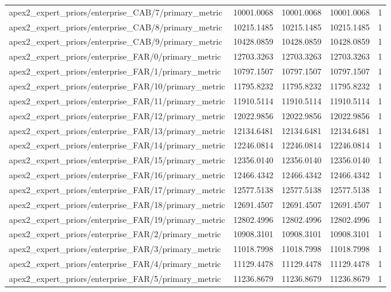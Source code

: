 \begin{table}[h]
\begin{tabular}{lrrrr}
apex2_expert_priors/enterprise_CAB/7/primary_metric & 10001.0068 & 10001.0068 & 10001.0068 & 1 \\
apex2_expert_priors/enterprise_CAB/8/primary_metric & 10215.1485 & 10215.1485 & 10215.1485 & 1 \\
apex2_expert_priors/enterprise_CAB/9/primary_metric & 10428.0859 & 10428.0859 & 10428.0859 & 1 \\
apex2_expert_priors/enterprise_FAR/0/primary_metric & 12703.3263 & 12703.3263 & 12703.3263 & 1 \\
apex2_expert_priors/enterprise_FAR/1/primary_metric & 10797.1507 & 10797.1507 & 10797.1507 & 1 \\
apex2_expert_priors/enterprise_FAR/10/primary_metric & 11795.8232 & 11795.8232 & 11795.8232 & 1 \\
apex2_expert_priors/enterprise_FAR/11/primary_metric & 11910.5114 & 11910.5114 & 11910.5114 & 1 \\
apex2_expert_priors/enterprise_FAR/12/primary_metric & 12022.9856 & 12022.9856 & 12022.9856 & 1 \\
apex2_expert_priors/enterprise_FAR/13/primary_metric & 12134.6481 & 12134.6481 & 12134.6481 & 1 \\
apex2_expert_priors/enterprise_FAR/14/primary_metric & 12246.0814 & 12246.0814 & 12246.0814 & 1 \\
apex2_expert_priors/enterprise_FAR/15/primary_metric & 12356.0140 & 12356.0140 & 12356.0140 & 1 \\
apex2_expert_priors/enterprise_FAR/16/primary_metric & 12466.4342 & 12466.4342 & 12466.4342 & 1 \\
apex2_expert_priors/enterprise_FAR/17/primary_metric & 12577.5138 & 12577.5138 & 12577.5138 & 1 \\
apex2_expert_priors/enterprise_FAR/18/primary_metric & 12691.4507 & 12691.4507 & 12691.4507 & 1 \\
apex2_expert_priors/enterprise_FAR/19/primary_metric & 12802.4996 & 12802.4996 & 12802.4996 & 1 \\
apex2_expert_priors/enterprise_FAR/2/primary_metric & 10908.3101 & 10908.3101 & 10908.3101 & 1 \\
apex2_expert_priors/enterprise_FAR/3/primary_metric & 11018.7998 & 11018.7998 & 11018.7998 & 1 \\
apex2_expert_priors/enterprise_FAR/4/primary_metric & 11129.4478 & 11129.4478 & 11129.4478 & 1 \\
apex2_expert_priors/enterprise_FAR/5/primary_metric & 11236.8679 & 11236.8679 & 11236.8679 & 1 \\

\end{tabular}
\end{table}
